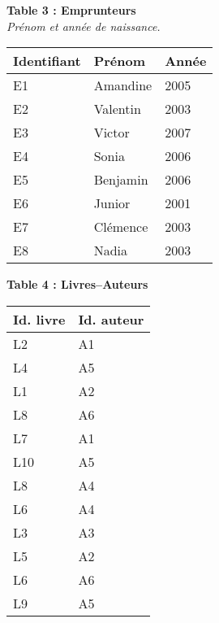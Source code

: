 \documentclass[class=report,crop=false, 12pt]{standalone}
\begin{document}
\bigskip

{\footnotesize
\begin{minipage}{0.4\textwidth}

\textbf{Table 3 : Emprunteurs}\\
\emph{Prénom et année de naissance.} \\

\begin{tabular}{|l|l|l|} \hline
\textbf{Identifiant} & \textbf{Prénom} & \textbf{Année} \\ \hline\hline
E1 & Amandine & 2005 \\ \hline
E2 & Valentin & 2003 \\ \hline
E3 & Victor & 2007 \\ \hline
E4 & Sonia & 2006 \\ \hline
E5 & Benjamin & 2006 \\ \hline
E6 & Junior & 2001 \\ \hline
E7 & Clémence &  2003 \\ \hline
E8 & Nadia & 2003 \\ \hline
\end{tabular}
\end{minipage}
%
%
\begin{minipage}{0.25\textwidth}

\textbf{Table 4 : Livres--Auteurs}\\

\begin{tabular}{|l|l|} \hline
\textbf{Id. livre} & \textbf{Id. auteur}  \\ \hline\hline
L2 & A1 \\ \hline
L4 & A5\\ \hline
L1 & A2 \\ \hline
L8 & A6 \\ \hline
L7 & A1 \\ \hline
L10 & A5 \\ \hline
L8 & A4 \\ \hline
L6 & A4 \\ \hline
L3 & A3 \\ \hline
L5 & A2 \\ \hline
L6 & A6 \\ \hline
L9 & A5 \\ \hline 
\end{tabular}
\end{minipage}
%
%
\begin{minipage}{0.25\textwidth}


\end{minipage}}
\end{document}
